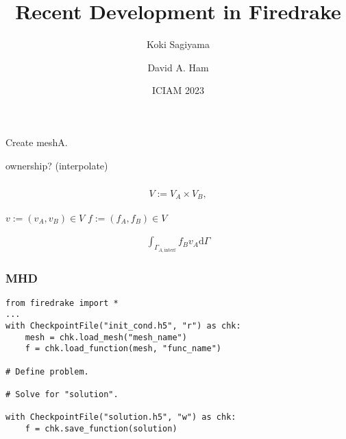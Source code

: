 \documentclass[]{beamer}
\newcommand{\dif}{\textrm{d}}
\begin{document}
    \title[]
              {Recent Development in \textsf{Firedrake}}
    \author{Koki Sagiyama \and David A. Ham}
    \date{ICIAM 2023}
\begin{frame}
    \titlepage
\end{frame}
\begin{frame}
\frametitle{}
\end{frame}
\begin{frame}
\frametitle{}
Create meshA.

ownership? (interpolate)

\end{frame}
\begin{frame}
\frametitle{}

\begin{align}
V:=V_A\times V_B,
\end{align}

$v:=(v_A, v_B)\in V$
$f:=(f_A, f_B)\in V$


\begin{align}
\int_{\Gamma_{A,\text{interf}}}f_Bv_A\dif\Gamma
\end{align}

\end{frame}
\begin{frame}[fragile]
\frametitle{MHD}
\begin{verbatim}
from firedrake import *
...
with CheckpointFile("init_cond.h5", "r") as chk:
    mesh = chk.load_mesh("mesh_name")
    f = chk.load_function(mesh, "func_name")

# Define problem.

# Solve for "solution".

with CheckpointFile("solution.h5", "w") as chk:
    f = chk.save_function(solution)
\end{verbatim}
\end{frame}
\end{document}
